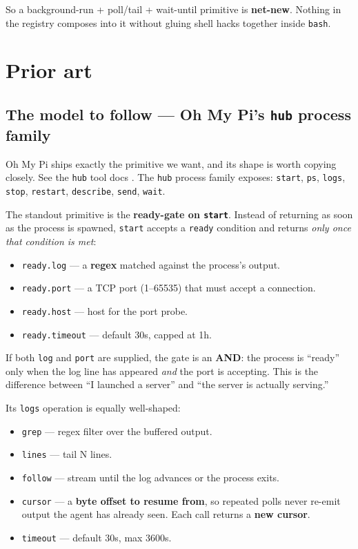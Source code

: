 \documentclass[11pt]{article}
\begin{document}
So a background-run + poll/tail + wait-until primitive is \textbf{net-new}.
Nothing in the registry composes into it without gluing shell hacks together
inside \texttt{bash}.

\section{Prior art}

\subsection{The model to follow --- Oh My Pi's \texttt{hub} process family}

Oh My Pi ships exactly the primitive we want, and its shape is worth copying
closely. See the \texttt{hub} tool docs \citep{omp-hub}. The \texttt{hub} process
family exposes: \texttt{start}, \texttt{ps}, \texttt{logs}, \texttt{stop},
\texttt{restart}, \texttt{describe}, \texttt{send}, \texttt{wait}.

The standout primitive is the \textbf{ready-gate on \texttt{start}}. Instead of
returning as soon as the process is spawned, \texttt{start} accepts a
\texttt{ready} condition and returns \textit{only once that condition is met}:

\begin{itemize}[leftmargin=*]
  \item \texttt{ready.log} --- a \textbf{regex} matched against the process's
  output.
  \item \texttt{ready.port} --- a TCP port (1--65535) that must accept a
  connection.
  \item \texttt{ready.host} --- host for the port probe.
  \item \texttt{ready.timeout} --- default 30s, capped at 1h.
\end{itemize}

If both \texttt{log} and \texttt{port} are supplied, the gate is an \textbf{AND}:
the process is ``ready'' only when the log line has appeared \textit{and} the port
is accepting. This is the difference between ``I launched a server'' and ``the
server is actually serving.''

Its \texttt{logs} operation is equally well-shaped:

\begin{itemize}[leftmargin=*]
  \item \texttt{grep} --- regex filter over the buffered output.
  \item \texttt{lines} --- tail N lines.
  \item \texttt{follow} --- stream until the log advances or the process exits.
  \item \texttt{cursor} --- a \textbf{byte offset to resume from}, so repeated
  polls never re-emit output the agent has already seen. Each call returns a
  \textbf{new cursor}.
  \item \texttt{timeout} --- default 30s, max 3600s.
\end{itemize}
\end{document}
